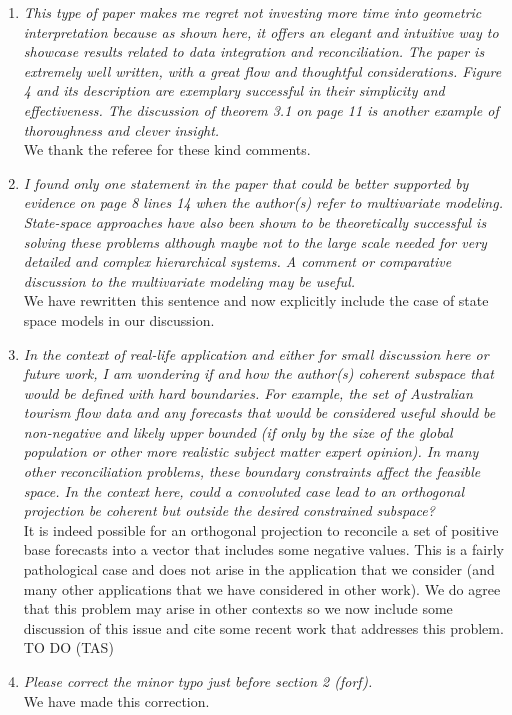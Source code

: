 \documentclass[a4paper,11pt]{article}
\begin{document}
	\begin{enumerate}	
	
	\item \textit{This type of paper makes me regret not investing more time into geometric interpretation because as shown here, it offers an elegant and intuitive way to showcase results related to data integration and reconciliation. The paper is extremely well written, with a great flow and thoughtful considerations. Figure 4 and its description are exemplary successful in their simplicity and effectiveness. The discussion of theorem 3.1 on page 11 is another example of thoroughness and clever insight.}\\
	
	We thank the referee for these kind comments.\\
	
    \item\textit{I found only one statement in the paper that could be better supported by evidence on page 8 lines 14 when the author(s) refer to multivariate modeling. State-space approaches have also been shown to be theoretically successful is solving these problems although maybe not to the large scale needed for very detailed and complex hierarchical systems. A comment or comparative discussion to the multivariate modeling may be useful.}\\
    
    We have rewritten this sentence and now explicitly include the case of state space models in our discussion.\\
    
    
    \item\textit{In the context of real-life application and either for small discussion here or future work, I am wondering if and how the author(s) coherent subspace that would be defined with hard boundaries. For example, the set of Australian tourism flow data and any forecasts that would be considered useful should be non-negative and likely upper bounded (if only by the size of the global population or other more realistic subject matter expert opinion). In many other reconciliation problems, these boundary constraints affect the feasible space. In the context here, could a convoluted case lead to an orthogonal projection be coherent but outside the desired constrained subspace?}\\
    It is indeed possible for an orthogonal projection to reconcile a set of positive base forecasts into a vector that includes some negative values.  This is a fairly pathological case and does not arise in the application that we consider (and many other applications that we have considered in other work).  We do agree that this problem may arise in other contexts so we now include some discussion of this issue and cite some recent work that addresses this problem. TO DO (TAS)\\

    \item\textit{Please correct the minor typo just before section 2 (forf).}\\
    We have made this correction.\\
    
    \end{enumerate}
\end{document}
